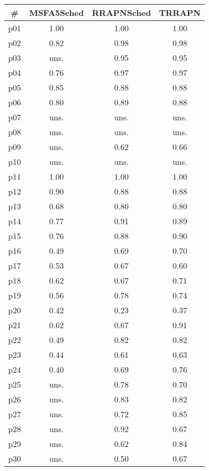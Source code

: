 \begin{tabular}{cccc}
\toprule
\textbf{\#} & \textbf{MSFA5Sched} & \textbf{RRAPNSched} & \textbf{TRRAPN}\\
\midrule
p01 & 1.00 & 1.00 & 1.00\\
p02 & 0.82 & 0.98 & 0.98\\
p03 & uns. & 0.95 & 0.95\\
p04 & 0.76 & 0.97 & 0.97\\
p05 & 0.85 & 0.88 & 0.88\\
p06 & 0.80 & 0.89 & 0.88\\
p07 & uns. & uns. & uns.\\
p08 & uns. & uns. & uns.\\
p09 & uns. & 0.62 & 0.66\\
p10 & uns. & uns. & uns.\\
p11 & 1.00 & 1.00 & 1.00\\
p12 & 0.90 & 0.88 & 0.88\\
p13 & 0.68 & 0.80 & 0.80\\
p14 & 0.77 & 0.91 & 0.89\\
p15 & 0.76 & 0.88 & 0.90\\
p16 & 0.49 & 0.69 & 0.70\\
p17 & 0.53 & 0.67 & 0.60\\
p18 & 0.62 & 0.67 & 0.71\\
p19 & 0.56 & 0.78 & 0.74\\
p20 & 0.42 & 0.23 & 0.37\\
p21 & 0.62 & 0.67 & 0.91\\
p22 & 0.49 & 0.82 & 0.82\\
p23 & 0.44 & 0.61 & 0.63\\
p24 & 0.40 & 0.69 & 0.76\\
p25 & uns. & 0.78 & 0.70\\
p26 & uns. & 0.83 & 0.82\\
p27 & uns. & 0.72 & 0.85\\
p28 & uns. & 0.92 & 0.67\\
p29 & uns. & 0.62 & 0.84\\
p30 & uns. & 0.50 & 0.67\\
\bottomrule
\end{tabular}


